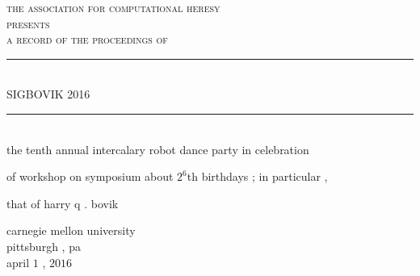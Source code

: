 \documentclass{article}
\begin{document}
\setmainfont{Splotch.ttf}
\setsansfont{Birbaslo.ttf}

\newcommand{\HRule}{\rule{\linewidth}{0.5mm}}

\begin{titlepage}
\begin{center}

\textsc{\LARGE the association for computational heresy}\\[0.5cm]

\textsc{\large presents}\\[1cm]

\textsc{\Large a record of the proceedings of}\\[0.5cm]
\HRule \\[0.4cm]
{ \Huge \sf SIGBOVIK 2016 \\[0.4cm] }

\HRule \\[2cm]


the tenth annual intercalary robot dance party in celebration

of workshop on symposium about $2^6$th birthdays{ ;} in particular{ ,}

that of harry q{ .} bovik

\vfill

{\Large carnegie mellon university\\[0.25cm]
pittsburgh{ ,} pa\\[0.3cm]
april $1${ ,} $2016$}

\end{center}
\end{titlepage}
\end{document}
